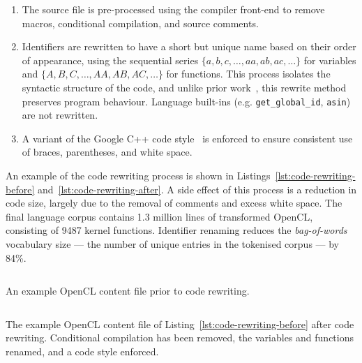 \begin{enumerate}
  \item The source file is pre-processed using the compiler front-end to remove macros, conditional compilation, and source comments.
  \item Identifiers are rewritten to have a short but unique name based on their order of appearance, using the sequential series $\{a,\allowbreak b,\allowbreak c,\allowbreak \ldots,\allowbreak aa,\allowbreak ab,\allowbreak ac,\allowbreak \ldots\}$ for variables and $\{A,\allowbreak B,\allowbreak C,\allowbreak \ldots,\allowbreak AA,\allowbreak AB,\allowbreak AC,\allowbreak \ldots\}$ for functions. This process isolates the syntactic structure of the code, and unlike prior work~\cite{Allamanis2013a}, this rewrite method preserves program behaviour. Language built-ins (e.g. \texttt{get\_global\_id}, \texttt{asin}) are not rewritten.
  \item A variant of the Google C++ code style~\cite{Weinberger2011} is enforced to ensure consistent use of braces, parentheses, and white space.
\end{enumerate}

An example of the code rewriting process is shown in Listings~\ref{lst:code-rewriting-before} and~\ref{lst:code-rewriting-after}. A side effect of this process is a reduction in code size, largely due to the removal of comments and excess white space. The final language corpus contains 1.3 million lines of transformed OpenCL, consisting of 9487 kernel functions. Identifier renaming reduces the \emph{bag-of-words} vocabulary size --- the number of unique entries in the tokenised corpus --- by 84\%.

\begin{listing}
  \inputminted{opencl_lexer.py:OpenCLLexer -x}{lst/clgen-rewrite-before.cl}
  \caption[Example OpenCL content file from GitHub]{An example OpenCL content file prior to code rewriting.}
  \label{lst:code-rewriting-before}
\end{listing}

\begin{listing}
  \inputminted{opencl_lexer.py:OpenCLLexer -x}{lst/clgen-rewrite-after.cl}
  \caption[OpenCL content file after rewriting]{The example OpenCL content file of Listing~\ref{lst:code-rewriting-before} after code rewriting. Conditional compilation has been removed, the variables and functions renamed, and a code style enforced.}
  \label{lst:code-rewriting-after}
\end{listing}


